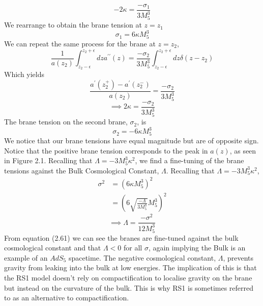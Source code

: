 \documentclass[11pt]{report}
\numberwithin{equation}{chapter}
\begin{document}
\begin{equation}
    -2\kappa=\frac{-\sigma_1}{3M^3_5}
\end{equation}
We rearrange to obtain the brane tension at $z=z_1$
\begin{equation}
    \sigma_1=6\kappa M^3_5
\end{equation}
We can repeat the same process for the brane at $z=z_2$,
\begin{equation}
    \frac{1}{a\left(z_2\right)}\int^{z_2+\epsilon}_{z_2-\epsilon}dza^{\prime\prime}\left(z\right)=\frac{-\sigma_2}{3M^3_5}\int^{z_2+\epsilon}_{z_2-\epsilon}dz\delta\left(z-z_2\right)
\end{equation}
Which yields
\begin{equation}
    \frac{a^\prime\left(z^{+}_2\right)-a^\prime\left(z^{-}_2\right)}{a\left(z_2\right)}=\frac{-\sigma_2}{3M^3_5}
\end{equation}
\begin{equation}
    \implies 2\kappa=\frac{-\sigma_2}{3M^3_5}
\end{equation}
The brane tension on the second brane, $\sigma_2$, is
\begin{equation}
    \sigma_2=-6\kappa M^3_5
\end{equation}
We notice that our brane tensions have equal magnitude but are of opposite sign. Notice that the positive brane tension corresponds to the peak in $a(z)$, as seen in Figure 2.1. Recalling that $\Lambda=-3M^3_5\kappa^2$, we find a fine-tuning of the brane tensions against the Bulk Cosmological Constant, $\Lambda$. Recalling that $\Lambda=-3M^3_5\kappa^2$,
\begin{align*}
    {\sigma}^2&=\left(6\kappa M^3_5\right)^2\nonumber\\
    &=\left(6\sqrt{\frac{-\Lambda}{3M^3_5}} M^3_5\right)^2
\end{align*}
\begin{equation}
    \implies \Lambda=\frac{-\sigma^2}{12M^3_5}
\end{equation}
From equation (2.61) we can see the branes are fine-tuned against the bulk cosmological constant and that $\Lambda<0$ for all $\sigma$, again implying the Bulk is an example of an $AdS_5$ spacetime. The negative cosmological constant, $\Lambda$, prevents gravity from leaking into the bulk at low energies. The implication of this is that the RS1 model doesn't rely on compactification to localise gravity on the brane but instead on the curvature of the bulk. This is why RS1 is sometimes referred to as an alternative to compactification.\\
\end{document}
